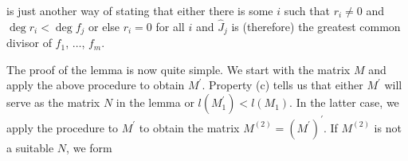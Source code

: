 is just another way of stating that either there is some \(i\) such that \(r_{i}\neq 0\) and \(\deg r_{i}<\deg f_{j}\) or else \(r_{i}=0\) for all \(i\) and \(\hat{J}_{j}\) is (therefore) the greatest common divisor of \(f_{1}\), \(\ldots\), \(f_{m}\).

The proof of the lemma is now quite simple. We start with the matrix \(M\) and apply the above procedure to obtain \(M^{\prime}\). Property (c) tells us that either \(M^{\prime}\) will serve as the matrix \(N\) in the lemma or \(l(M^{\prime}_{1})<l(M_{1})\). In the latter case, we apply the procedure to \(M^{\prime}\) to obtain the matrix \(M^{(2)}=(M^{\prime})^{\prime}\). If \(M^{(2)}\) is not a suitable \(N\), we form 